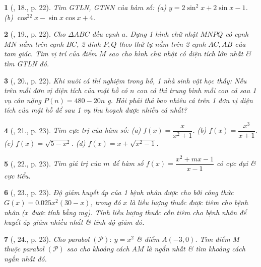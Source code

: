 \documentclass{article}
\newtheorem{baitoan}{}
\begin{document}
\begin{baitoan}[\cite{SGK_Toan_12_giai_tich_nang_cao}, 18., p. 22]
	Tìm {\rm GTLN, GTNN} của hàm số: (a) $y = 2\sin^2x + 2\sin x - 1$. (b) $\cos^22x - \sin x\cos x + 4$.
\end{baitoan}

\begin{baitoan}[\cite{SGK_Toan_12_giai_tich_nang_cao}, 19., p. 22]
	Cho $\Delta ABC$ đều cạnh $a$. Dựng 1 hình chữ nhật $MNPQ$ có cạnh $MN$ nằm trên cạnh $BC$, 2 đỉnh $P,Q$ theo thứ tự nằm trên 2 cạnh $AC,AB$ của tam giác. Tìm vị trí của điểm $M$ sao cho hình chữ nhật có diện tích lớn nhất \& tìm {\rm GTLN} đó.
\end{baitoan}

\begin{baitoan}[\cite{SGK_Toan_12_giai_tich_nang_cao}, 20., p. 22]
	Khi nuôi cá thí nghiệm trong hồ, 1 nhà sinh vật học thấy: Nếu trên mỗi đơn vị diện tích của mặt hồ có $n$ con cá thì trung bình mỗi con cá sau 1 vụ cân nặng $P(n) = 480 - 20n$ {\rm g}. Hỏi phải thả bao nhiêu cá trên 1 đơn vị diện tích của mặt hồ để sau 1 vụ thu hoạch được nhiều cá nhất?
\end{baitoan}

\begin{baitoan}[\cite{SGK_Toan_12_giai_tich_nang_cao}, 21., p. 23]
	Tìm cực trị của hàm số: (a) $f(x)  = \dfrac{x}{x^2 + 1}$. (b) $f(x) = \dfrac{x^3}{x + 1}$. (c) $f(x) = \sqrt{5 - x^2}$. (d) $f(x) = x + \sqrt{x^2 - 1}$.
\end{baitoan}

\begin{baitoan}[\cite{SGK_Toan_12_giai_tich_nang_cao}, 22., p. 23]
	Tìm giá trị của $m$ để hàm số $f(x) = \dfrac{x^2 + mx - 1}{x - 1}$ có cực đại \& cực tiểu.
\end{baitoan}

\begin{baitoan}[\cite{SGK_Toan_12_giai_tich_nang_cao}, 23., p. 23]
	Độ giảm huyết áp của 1 bệnh nhân được cho bởi công thức $G(x) = 0.025x^2(30 - x)$, trong đó $x$ là liều lượng thuốc được tiêm cho bệnh nhân ($x$ được tính bằng {\rm mg}). Tính liều lượng thuốc cần tiêm cho bệnh nhân để huyết áp giảm nhiều nhất \& tính độ giảm đó.
\end{baitoan}

\begin{baitoan}[\cite{SGK_Toan_12_giai_tich_nang_cao}, 24., p. 23]
	Cho parabol $(\mathcal{P}):\ y = x^2$ \& điểm $A(-3,0)$. Tìm điểm $M$ thuộc parabol $(\mathcal{P})$ sao cho khoảng cách $AM$ là ngắn nhất \& tìm khoảng cách ngắn nhất đó.
\end{baitoan}
\end{document}
